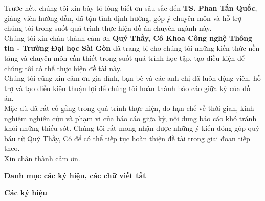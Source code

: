 \documentclass[14pt,a4paper]{extarticle}
\begin{document}
\noindent Trước hết, chúng tôi xin bày tỏ lòng biết ơn sâu sắc đến \textbf{TS. Phan Tấn Quốc}, giảng viên hướng dẫn, đã tận tình định hướng, góp ý chuyên môn và hỗ trợ chúng tôi trong suốt quá trình thực hiện đồ án chuyên ngành này. 
\\ \noindent Chúng tôi xin chân thành cảm ơn \textbf{Quý Thầy, Cô Khoa Công nghệ Thông tin - Trường Đại học Sài Gòn} đã trang bị cho chúng tôi những kiến thức nền tảng và chuyên môn cần thiết trong suốt quá trình học tập, tạo điều kiện để chúng tôi có thể thực hiện đề tài này. 
\\ \noindent Chúng tôi cũng xin cảm ơn gia đình, bạn bè và các anh chị đã luôn động viên, hỗ trợ và tạo điều kiện thuận lợi để chúng tôi hoàn thành báo cáo giữa kỳ của đồ án. 
\\ \noindent Mặc dù đã rất cố gắng trong quá trình thực hiện, do hạn chế về thời gian, kinh nghiệm nghiên cứu và phạm vi của báo cáo giữa kỳ, nội dung báo cáo khó tránh khỏi những thiếu sót. Chúng tôi rất mong nhận được những ý kiến đóng góp quý báu từ Quý Thầy, Cô để có thể tiếp tục hoàn thiện đề tài trong giai đoạn tiếp theo. 
\\ \noindent Xin chân thành cảm ơn. 


\newpage
\begin{center}
\textbf{\fontsize{20}{24}\selectfont
Danh mục các ký hiệu, các chữ viết tắt}
\end{center}

\noindent \textbf{Các ký hiệu}
\end{document}
